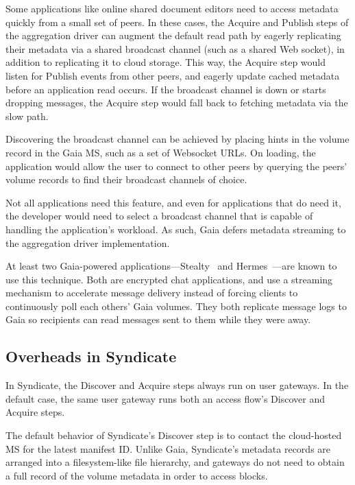 \hfill \break
{}
\hfill \break

Some applications like online shared document editors need to access metadata quickly
from a small set of peers.  In these cases, the Acquire and Publish steps of the
aggregation driver can augment the default read path by eagerly replicating
their metadata via a shared broadcast channel (such as a shared Web socket), in
addition to replicating it to cloud storage.
This way, the Acquire step would listen for Publish events from other peers, and
eagerly update cached metadata before an application read occurs.  If the
broadcast channel is down or starts dropping messages, the Acquire step would fall back
to fetching metadata via the slow path.

Discovering the broadcast channel can be achieved by placing hints in the
volume record in the Gaia MS, such as a set of Websocket URLs.  On loading, the
application would allow the user to connect to other peers by querying the
peers' volume records to find their broadcast channels of choice.

Not all applications need this feature, and even for applications that do need
it, the developer would need to select a broadcast channel that is capable of
handling the application's workload.  As such, Gaia defers
metadata streaming to the aggregation driver implementation.

At least two Gaia-powered applications---Stealty~\cite{stealthy.im} and
Hermes~\cite{hi-hermes}---are known to use this technique.  Both are
encrypted chat applications, and use a streaming mechanism to accelerate message delivery instead of
forcing clients to continuously poll each others' Gaia volumes.  They
both replicate message logs to Gaia so recipients can read messages
sent to them while they were away.

\subsection{Overheads in Syndicate}

In Syndicate, the Discover and Acquire steps always run on user gateways.
In the default case, the same user gateway runs both
an access flow's Discover and Acquire steps.

The default behavior of Syndicate's Discover step is to contact the
cloud-hosted MS for the latest manifest ID.  Unlike Gaia, Syndicate's
metadata records are arranged into a filesystem-like file hierarchy, and
gateways do not need to obtain a full record of the volume metadata in order to access
blocks.

